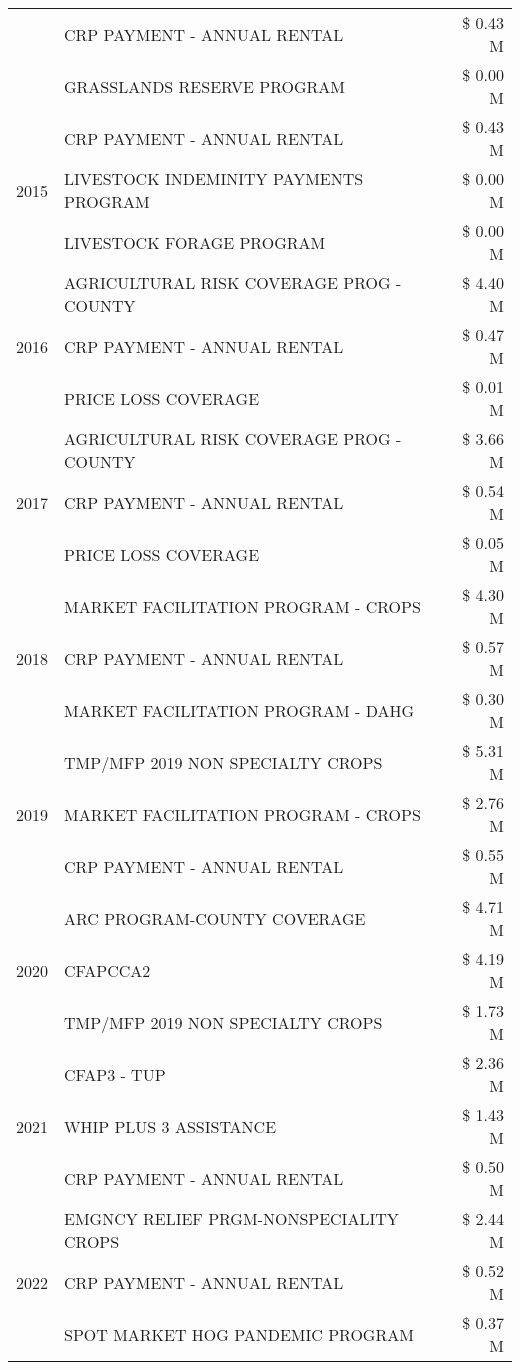 \begin{tabular}{llr}
 & CRP PAYMENT - ANNUAL RENTAL & \$ 0.43 M \\
 & GRASSLANDS RESERVE PROGRAM & \$ 0.00 M \\
\cline{1-3}
\multirow[t]{3}{*}{2015} & CRP PAYMENT - ANNUAL RENTAL & \$ 0.43 M \\
 & LIVESTOCK INDEMINITY PAYMENTS PROGRAM & \$ 0.00 M \\
 & LIVESTOCK FORAGE PROGRAM & \$ 0.00 M \\
\cline{1-3}
\multirow[t]{3}{*}{2016} & AGRICULTURAL RISK COVERAGE PROG - COUNTY & \$ 4.40 M \\
 & CRP PAYMENT - ANNUAL RENTAL & \$ 0.47 M \\
 & PRICE LOSS COVERAGE & \$ 0.01 M \\
\cline{1-3}
\multirow[t]{3}{*}{2017} & AGRICULTURAL RISK COVERAGE PROG - COUNTY & \$ 3.66 M \\
 & CRP PAYMENT - ANNUAL RENTAL & \$ 0.54 M \\
 & PRICE LOSS COVERAGE & \$ 0.05 M \\
\cline{1-3}
\multirow[t]{3}{*}{2018} & MARKET FACILITATION PROGRAM - CROPS & \$ 4.30 M \\
 & CRP PAYMENT - ANNUAL RENTAL & \$ 0.57 M \\
 & MARKET FACILITATION PROGRAM - DAHG & \$ 0.30 M \\
\cline{1-3}
\multirow[t]{3}{*}{2019} & TMP/MFP 2019 NON SPECIALTY CROPS & \$ 5.31 M \\
 & MARKET FACILITATION PROGRAM - CROPS & \$ 2.76 M \\
 & CRP PAYMENT - ANNUAL RENTAL & \$ 0.55 M \\
\cline{1-3}
\multirow[t]{3}{*}{2020} & ARC PROGRAM-COUNTY COVERAGE & \$ 4.71 M \\
 & CFAPCCA2 & \$ 4.19 M \\
 & TMP/MFP 2019 NON SPECIALTY CROPS & \$ 1.73 M \\
\cline{1-3}
\multirow[t]{3}{*}{2021} & CFAP3 - TUP & \$ 2.36 M \\
 & WHIP PLUS 3 ASSISTANCE & \$ 1.43 M \\
 & CRP PAYMENT - ANNUAL RENTAL & \$ 0.50 M \\
\cline{1-3}
\multirow[t]{3}{*}{2022} & EMGNCY RELIEF PRGM-NONSPECIALITY CROPS & \$ 2.44 M \\
 & CRP PAYMENT - ANNUAL RENTAL & \$ 0.52 M \\
 & SPOT MARKET HOG PANDEMIC PROGRAM & \$ 0.37 M \\
\cline{1-3}
\bottomrule
\end{tabular}
